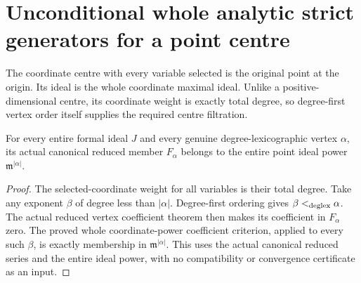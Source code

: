 \section{Unconditional whole analytic strict generators for a point centre}

The coordinate centre with every variable selected is the original point
at the origin. Its ideal is the whole coordinate maximal ideal. Unlike a
positive-dimensional centre, its coordinate weight is exactly total degree,
so degree-first vertex order itself supplies the required centre filtration.

\begin{lemma}
\label{hir:actual-point-centre-canonical-vertex-powers}
\leanok
For every entire formal ideal $J$ and every genuine degree-lexicographic
vertex $\alpha$, its actual canonical reduced member $F_\alpha$ belongs to
the entire point ideal power $\mathfrak m^{|\alpha|}$.
\end{lemma}
\begin{proof}
The selected-coordinate weight for all variables is their total degree.
Take any exponent $\beta$ of degree less than $|\alpha|$. Degree-first
ordering gives $\beta<_{\operatorname{deglex}}\alpha$. The actual reduced vertex
coefficient theorem then makes its coefficient in $F_\alpha$ zero.
The proved whole coordinate-power coefficient criterion, applied to every
such $\beta$, is exactly membership in $\mathfrak m^{|\alpha|}$. This uses
the actual canonical reduced series and the entire ideal power, with no
compatibility or convergence certificate as an input.
\end{proof}

